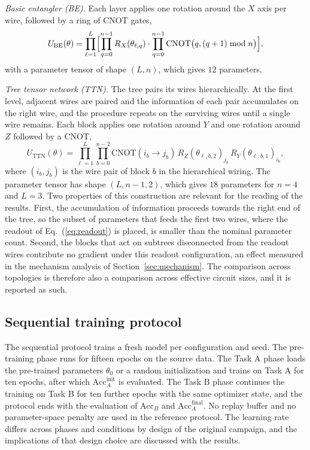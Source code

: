 \documentclass[preprint,number,sort&compress]{elsarticle}
\begin{document}
\emph{Basic entangler (BE).} Each layer applies one rotation around the $X$
axis per wire, followed by a ring of CNOT gates,
\begin{equation}
  U_{\text{BE}}(\theta) = \prod_{\ell=1}^{L}
  \Bigl[\prod_{q=0}^{n-1} R_X(\theta_{\ell,q}) \cdot
  \prod_{q=0}^{n-1} \mathrm{CNOT}\bigl(q, (q+1) \bmod n\bigr)\Bigr],
  \label{eq:be}
\end{equation}
with a parameter tensor of shape $(L, n)$, which gives $12$ parameters.

\emph{Tree tensor network (TTN).} The tree pairs its wires hierarchically.
At the first level, adjacent wires are paired and the information of each
pair accumulates on the right wire, and the procedure repeats on the
surviving wires until a single wire remains. Each block applies one
rotation around $Y$ and one rotation around $Z$ followed by a CNOT,
\begin{equation}
  U_{\text{TTN}}(\theta) = \prod_{\ell=1}^{L} \prod_{b=0}^{n-2}
  \mathrm{CNOT}(i_b \to j_b)\, R_Z(\theta_{\ell,b,2})_{j_b}\, R_Y(\theta_{\ell,b,1})_{i_b},
  \label{eq:ttn}
\end{equation}
where $(i_b, j_b)$ is the wire pair of block $b$ in the hierarchical wiring.
The parameter tensor has shape $(L, n-1, 2)$, which gives $18$ parameters for
$n=4$ and $L=3$. Two properties of this construction are relevant for the
reading of the results. First, the accumulation of information proceeds
towards the right end of the tree, so the subset of parameters that feeds the
first two wires, where the readout of Eq.~(\ref{eq:readout}) is placed, is
smaller than the nominal parameter count. Second, the blocks that act on
subtrees disconnected from the readout wires contribute no gradient under
this readout configuration, an effect measured in the mechanism analysis of
Section~\ref{sec:mechanism}. The comparison across topologies is therefore
also a comparison across effective circuit sizes, and it is reported as such.

\subsection{Sequential training protocol}

The sequential protocol trains a fresh model per configuration and seed. The
pre-training phase runs for fifteen epochs on the source data. The Task A
phase loads the pre-trained parameters $\theta_0$ or a random initialization
and trains on Task A for ten epochs, after which
$\mathrm{Acc}_A^{\text{init}}$ is evaluated. The Task B phase continues the
training on Task B for ten further epochs with the same optimizer state, and
the protocol ends with the evaluation of $\mathrm{Acc}_B$ and
$\mathrm{Acc}_A^{\text{final}}$. No replay buffer and no parameter-space
penalty are used in the reference protocol. The learning rate differs across
phases and conditions by design of the original campaign, and the
implications of that design choice are discussed with the results.
\end{document}
